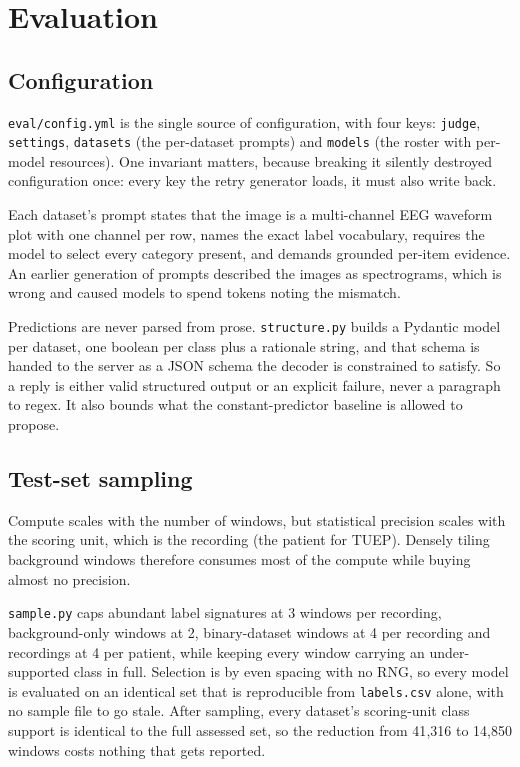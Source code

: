 \documentclass[11pt,a4paper]{article}
\newcommand{\file}[1]{{\small\texttt{#1}}}
\begin{document}
\section{Evaluation}

\subsection{Configuration}

\file{eval/config.yml} is the single source of configuration, with four keys:
\texttt{judge}, \texttt{settings}, \texttt{datasets} (the per-dataset prompts)
and \texttt{models} (the roster with per-model resources). One invariant matters,
because breaking it silently destroyed configuration once: every key the retry
generator loads, it must also write back.

Each dataset's prompt states that the image is a multi-channel EEG waveform plot
with one channel per row, names the exact label vocabulary, requires the model to
select every category present, and demands grounded per-item evidence. An earlier
generation of prompts described the images as spectrograms, which is wrong and
caused models to spend tokens noting the mismatch.

Predictions are never parsed from prose. \file{structure.py} builds a Pydantic
model per dataset, one boolean per class plus a rationale string, and that schema
is handed to the server as a JSON schema the decoder is constrained to satisfy.
So a reply is either valid structured output or an explicit failure, never a
paragraph to regex. It also bounds what the constant-predictor baseline is allowed
to propose.

\subsection{Test-set sampling}
\label{sec:sampling}

Compute scales with the number of windows, but statistical precision scales with
the scoring unit, which is the recording (the patient for TUEP). Densely tiling
background windows therefore consumes most of the compute while buying almost no
precision.

\file{sample.py} caps abundant label signatures at 3 windows per recording,
background-only windows at 2, binary-dataset windows at 4 per recording and
recordings at 4 per patient, while keeping every window carrying an
under-supported class in full. Selection is by even spacing with no RNG, so every
model is evaluated on an identical set that is reproducible from
\file{labels.csv} alone, with no sample file to go stale. After sampling, every
dataset's scoring-unit class support is identical to the full assessed set, so
the reduction from 41{,}316 to 14{,}850 windows costs nothing that gets reported.
\end{document}
